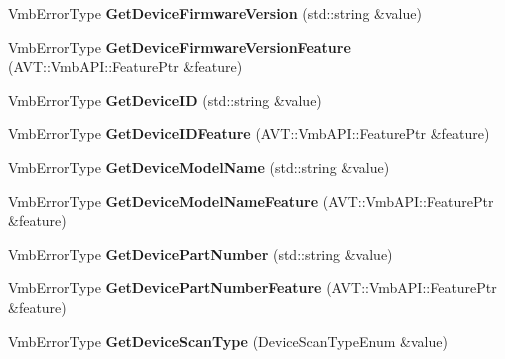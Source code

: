 \begin{DoxyCompactItemize}
\item 
\hypertarget{classMakoCamera_a9690ab26b1a9201670331cd231a94837}{Vmb\-Error\-Type {\bfseries Get\-Device\-Firmware\-Version} (std\-::string \&value)}\label{classMakoCamera_a9690ab26b1a9201670331cd231a94837}

\item 
\hypertarget{classMakoCamera_a9d5145e1e3ea9b757a427a4e31fcc83a}{Vmb\-Error\-Type {\bfseries Get\-Device\-Firmware\-Version\-Feature} (A\-V\-T\-::\-Vmb\-A\-P\-I\-::\-Feature\-Ptr \&feature)}\label{classMakoCamera_a9d5145e1e3ea9b757a427a4e31fcc83a}

\item 
\hypertarget{classMakoCamera_aa68a090c75be1f2c0ac1030be9b808a1}{Vmb\-Error\-Type {\bfseries Get\-Device\-I\-D} (std\-::string \&value)}\label{classMakoCamera_aa68a090c75be1f2c0ac1030be9b808a1}

\item 
\hypertarget{classMakoCamera_a48efc3f1c02766e5b4e7e20b2bcc5960}{Vmb\-Error\-Type {\bfseries Get\-Device\-I\-D\-Feature} (A\-V\-T\-::\-Vmb\-A\-P\-I\-::\-Feature\-Ptr \&feature)}\label{classMakoCamera_a48efc3f1c02766e5b4e7e20b2bcc5960}

\item 
\hypertarget{classMakoCamera_a01c84775556779047fbe3a4b9d2173be}{Vmb\-Error\-Type {\bfseries Get\-Device\-Model\-Name} (std\-::string \&value)}\label{classMakoCamera_a01c84775556779047fbe3a4b9d2173be}

\item 
\hypertarget{classMakoCamera_ac94f8aa8c987502417103c15a69e1326}{Vmb\-Error\-Type {\bfseries Get\-Device\-Model\-Name\-Feature} (A\-V\-T\-::\-Vmb\-A\-P\-I\-::\-Feature\-Ptr \&feature)}\label{classMakoCamera_ac94f8aa8c987502417103c15a69e1326}

\item 
\hypertarget{classMakoCamera_a44e2ace63c18e80f89e6da40c6ffecee}{Vmb\-Error\-Type {\bfseries Get\-Device\-Part\-Number} (std\-::string \&value)}\label{classMakoCamera_a44e2ace63c18e80f89e6da40c6ffecee}

\item 
\hypertarget{classMakoCamera_aeebb4a275b98496c204215849c5810f3}{Vmb\-Error\-Type {\bfseries Get\-Device\-Part\-Number\-Feature} (A\-V\-T\-::\-Vmb\-A\-P\-I\-::\-Feature\-Ptr \&feature)}\label{classMakoCamera_aeebb4a275b98496c204215849c5810f3}

\item 
\hypertarget{classMakoCamera_abc58f61895e3f03d3f7c1699cdb4ed6b}{Vmb\-Error\-Type {\bfseries Get\-Device\-Scan\-Type} (Device\-Scan\-Type\-Enum \&value)}\label{classMakoCamera_abc58f61895e3f03d3f7c1699cdb4ed6b}


\end{DoxyCompactItemize}
